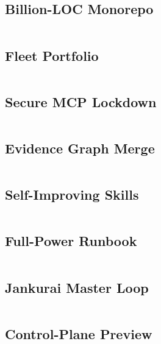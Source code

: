 \documentclass[conference]{IEEEtran}
\begin{document}
\subsection{Billion-LOC Monorepo}
\inputminted{yaml}{listings/billion-loc-monorepo.zyal.yml}

\subsection{Fleet Portfolio}
\inputminted{yaml}{listings/fleet-portfolio.zyal.yml}

\subsection{Secure MCP Lockdown}
\inputminted{yaml}{listings/secure-mcp-lockdown.zyal.yml}

\subsection{Evidence Graph Merge}
\inputminted{yaml}{listings/evidence-graph-merge.zyal.yml}

\subsection{Self-Improving Skills}
\inputminted{yaml}{listings/self-improving-skills.zyal.yml}

\subsection{Full-Power Runbook}
\inputminted{yaml}{listings/full-power-runbook.zyal.yml}

\subsection{Jankurai Master Loop}
\inputminted{yaml}{listings/jankurai-master-loop.zyal.yml}

\subsection{Control-Plane Preview}
\inputminted{yaml}{listings/control-plane-preview.zyal.yml}

\balance


\end{document}
